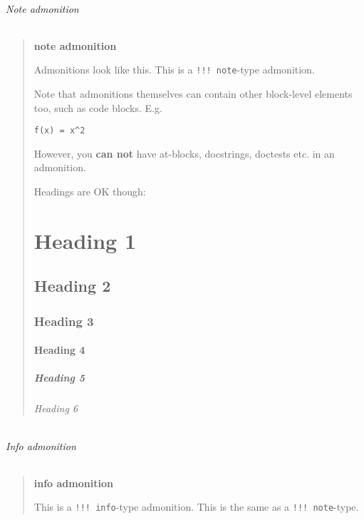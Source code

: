 \subparagraph{Note admonition}



\label{3427999462323267970}{}


\begin{quote}
\textbf{{\textquotesingle}note{\textquotesingle} admonition}

Admonitions look like this. This is a \texttt{!!! note}-type admonition.

Note that admonitions themselves can contain other block-level elements too, such as code blocks. E.g.


\begin{verbatim}
f(x) = x^2
\end{verbatim}

However, you \textbf{can not} have at-blocks, docstrings, doctests etc. in an admonition.

Headings are OK though:

\chapter{Heading 1}

\section{Heading 2}

\subsection{Heading 3}

\subsubsection{Heading 4}

\paragraph{Heading 5}

\subparagraph{Heading 6}

\end{quote}


\subparagraph{Info admonition}



\label{3520455154602929669}{}


\begin{quote}
\textbf{{\textquotesingle}info{\textquotesingle} admonition}

This is a \texttt{!!! info}-type admonition. This is the same as a \texttt{!!! note}-type.

\end{quote}


